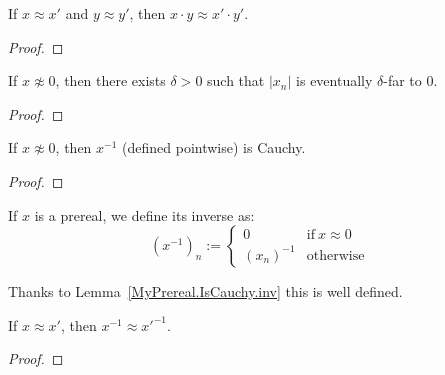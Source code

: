 \begin{lemma}
    \label{MyPrereal.mul_quotient}
    \leanok
    If $x \approx x'$ and $y \approx y'$, then $x \cdot y \approx x' \cdot y'$.
\end{lemma}
\begin{proof}
    \leanok
\end{proof}

\begin{lemma}
    \label{MyPrereal.pos_of_not_equiv_zero}
    \leanok
    If $x \not\approx 0$, then there exists $\delta > 0$ such that $|x_n|$ is eventually $\delta$-far to $0$.
\end{lemma}
\begin{proof}
    \leanok
\end{proof}

\begin{lemma}
    \label{MyPrereal.IsCauchy.inv}
    \leanok
    If $x \not\approx 0$, then $x^{-1}$ (defined pointwise) is Cauchy.
\end{lemma}
\begin{proof}
    \leanok
\end{proof}

\begin{definition}
    \label{MyPrereal.inv}
    \leanok
    If $x$ is a prereal, we define its inverse as:
    \[
      (x^{-1})_n := \begin{cases}
          0 & \text{if}\ x \approx 0 \\
          (x_n)^{-1} & \text{otherwise}
      \end{cases}
    \]

    Thanks to Lemma~\ref{MyPrereal.IsCauchy.inv} this is well defined.
\end{definition}

\begin{lemma}
    \label{MyPrereal.inv_quotient}
    \leanok
    If $x \approx x'$, then $x^{-1} \approx x'^{-1}$.
\end{lemma}
\begin{proof}
    \leanok
\end{proof}

